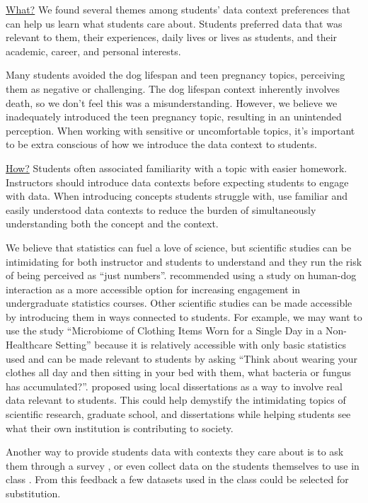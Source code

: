 \documentclass[
  12pt]{article}
\begin{document}
\underline{What?} We found several themes among students' data context
preferences that can help us learn what students care about. Students
preferred data that was relevant to them, their experiences, daily lives
or lives as students, and their academic, career, and personal
interests.

Many students avoided the dog lifespan and teen pregnancy topics,
perceiving them as negative or challenging. The dog lifespan context
inherently involves death, so we don't feel this was a misunderstanding.
However, we believe we inadequately introduced the teen pregnancy topic,
resulting in an unintended perception. When working with sensitive or
uncomfortable topics, it's important to be extra conscious of how we
introduce the data context to students.

\underline{How?} Students often associated familiarity with a topic with
easier homework. Instructors should introduce data contexts before
expecting students to engage with data. When introducing concepts
students struggle with, use familiar and easily understood data contexts
to reduce the burden of simultaneously understanding both the concept
and the context.

We believe that statistics can fuel a love of science, but scientific
studies can be intimidating for both instructor and students to
understand and they run the risk of being perceived as ``just numbers''.
\citet{evans2023} recommended using a study on human-dog interaction as
a more accessible option for increasing engagement in undergraduate
statistics courses. Other scientific studies can be made accessible by
introducing them in ways connected to students. For example, we may want
to use the study ``Microbiome of Clothing Items Worn for a Single Day in
a Non-Healthcare Setting'' because it is relatively accessible with only
basic statistics used \citep{whitehead2023} and can be made relevant to
students by asking ``Think about wearing your clothes all day and then
sitting in your bed with them, what bacteria or fungus has
accumulated?''. \citet{singer1990} proposed using local dissertations as
a way to involve real data relevant to students. This could help
demystify the intimidating topics of scientific research, graduate
school, and dissertations while helping students see what their own
institution is contributing to society.

Another way to provide students data with contexts they care about is to
ask them through a survey \citep{weiland2024}, or even collect data on
the students themselves to use in class \citep{schneiter2023}. From this
feedback a few datasets used in the class could be selected for
substitution.
\end{document}
